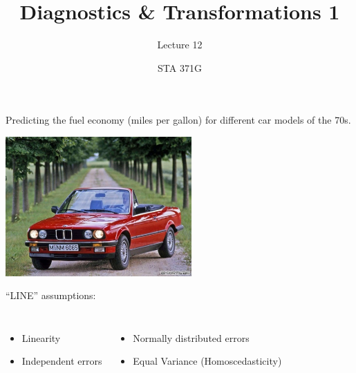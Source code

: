 \documentclass{beamer}\usepackage[]{graphicx}\usepackage[]{color}
\title{Diagnostics \& Transformations 1}
\subtitle{Lecture 12}
\author{STA 371G}
\begin{document}
  
  

  \frame{\maketitle}



  \begin{darkframes}
    
    
    \begin{frame}
      \fontsize{9}{9}\selectfont
      Predicting the fuel economy (miles per gallon) for different car models of the 70s.
      
      \begin{center}
        \includegraphics[width=2.8in]{bmw} \\
      \end{center} \pause
      
      ``LINE'' assumptions:
      \begin{columns}[onlytextwidth]
          \begin{itemize}
            \item Linearity
            \item Independent errors
          \end{itemize}
          \begin{itemize}
            \item Normally distributed errors
            \item Equal Variance (Homoscedasticity)
          \end{itemize}
      \end{columns}
    \end{frame}
    

\end{darkframes}
\end{document}
